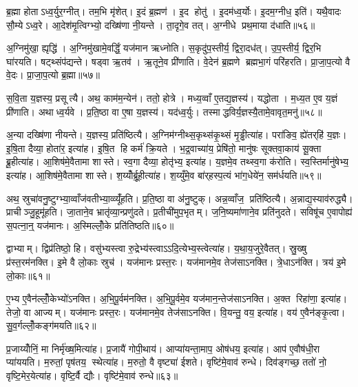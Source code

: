 ब्र॒ह्मा होताऽध्व॒र्युर॒ग्नीत्। तम॒भि मृ॑शेत्। इ॒दं ब्र॒ह्मण॑। इ॒द होतु॑। इ॒दम॑ध्व॒र्योः। इ॒दम॒ग्नीध॒ इति॑। यथै॒वादः सौ॒म्येऽध्व॒रे। आ॒देश॑मृ॒त्विग्भ्यो॒ दख्षि॑णा नी॒यन्ते। ता॒दृगे॒व तत्। अ॒ग्नीधे प्रथ॒माया द॑धाति॥५६॥

अ॒ग्निमु॑खा॒ ह्यृद्धि॑। अ॒ग्निमु॑खामे॒वर्द्धिं॒ यज॑मान ऋध्नोति। स॒कृदु॑प॒स्तीर्य॒ द्विरा॒दध॑त्। उ॒प॒स्तीर्य॒ द्विर॒भि घा॑रयति। षट्थ्संप॑द्यन्ते। षड्वा ऋ॒तव॑। ऋ॒तूने॒व प्री॑णाति। वे॒देन॑ ब्र॒ह्मणे ब्रह्मभा॒गं परि॑हरति। प्रा॒जा॒प॒त्यो वै वे॒दः। प्रा॒जा॒प॒त्यो ब्र॒ह्मा॥५७॥

स॒वि॒ता य॒ज्ञस्य॒ प्रसूत्यै। अथ॒ काम॑म॒न्येन॑। ततो॒ होत्रे। मध्य॒व्वाँ ए॒तद्य॒ज्ञस्य॑। यद्धोता। म॒ध्य॒त ए॒व य॒ज्ञं प्री॑णाति। अथाध्व॒र्यवे। प्र॒ति॒ष्ठा वा ए॒षा य॒ज्ञस्य॑। यद॑ध्व॒र्युः। तस्माद्धविर्य॒ज्ञस्यै॒तामे॒वावृत॒मनु॑॥५८॥

अ॒न्या दख्षि॑णा नीयन्ते। य॒ज्ञस्य॒ प्रति॑ष्ठित्यै। अ॒ग्निम॑ग्नीथ्स॒कृथ्स॑कृ॒थ्सं मृ॒ड्ढीत्या॑ह। परा॑ङिव॒ ह्ये॑तर्‌हि॑ य॒ज्ञः। इ॒षि॒ता दैव्या॒ होता॑र॒ इत्या॑ह। इ॒षि॒त हि कर्म॑ क्रि॒यते। भ॒द्र॒वाच्या॑य॒ प्रेषि॑तो॒ मानु॑षः सूक्तवा॒काय॑ सू॒क्ता ब्रू॒हीत्या॑ह। आ॒शिष॑मे॒वैतामा शास्ते। स्व॒गा दैव्या॒ होतृ॑भ्य॒ इत्या॑ह। य॒ज्ञमे॒व तथ्स्व॒गा क॑रोति। स्व॒स्तिर्मानु॑षेभ्य॒ इत्या॑ह। आ॒शिष॑मे॒वैतामा शास्ते। श॒य्योँर्ब्रू॒हीत्या॑ह। श॒य्युँमे॒व बा॑र्‌हस्प॒त्यं भा॑ग॒धेये॑न॒ सम॑र्धयति॥५९॥\anuvakamend[च॒र॒त्य॒ध्व॒र्युः प्रजा॑तिर्ह्वयते॒ वेदाब्रवीद्बर्‌हि॒षद॑ङ्करोत्यृ॒त्विजो॑ दधाति ब्र॒ह्माऽनु॑करोति च॒त्वारि॑ च]

अथ॒ स्रुचा॑वनु॒ष्टुग्भ्या॒व्वाँज॑वतीभ्या॒व्व्यूँ॑हति। प्र॒ति॒ष्ठा वा अ॑नु॒ष्टुक्। अन्न॒व्वाँज॒ प्रति॑ष्ठित्यै। अ॒न्नाद्य॒स्याव॑रुद्ध्यै। प्राचीञ्जु॒हूमू॑हति। जा॒ताने॒व भ्रातृ॑व्या॒न्प्रणु॑दते। प्र॒तीची॑मुप॒भृतम्। ज॒नि॒ष्यमा॑णाने॒व प्रति॑नुदते। सविषू॑च ए॒वापोह्य॑ स॒पत्ना॒न्॒ यज॑मानः। अ॒स्मिल्लोँ॒के प्रति॑तिष्ठति॥६०॥

द्वाभ्याम्। द्विप्र॑तिष्ठो॒ हि। वसु॑भ्यस्त्वा रु॒द्रेभ्य॑स्त्वाऽऽदि॒त्येभ्य॒स्त्वेत्या॑ह। य॒था॒य॒जुरे॒वैतत्। स्रु॒ख्षु प्र॑स्त॒रम॑नक्ति। इ॒मे वै लो॒काः स्रुच॑। यज॑मानः प्रस्त॒रः। यज॑मानमे॒व तेज॑साऽनक्ति। त्रे॒धाऽन॑क्ति। त्रय॑ इ॒मे लो॒काः॥६१॥

ए॒भ्य ए॒वैन॑ल्लोँ॒केभ्यो॑ऽनक्ति। अ॒भि॒पू॒र्वम॑नक्ति। अ॒भि॒पू॒र्वमे॒व यज॑मान॒न्तेज॑साऽनक्ति। अ॒क्त रिहा॑णा॒ इत्या॑ह। तेजो॒ वा आज्यम्। यज॑मानः प्रस्त॒रः। यज॑मानमे॒व तेज॑साऽनक्ति। वि॒यन्तु॒ वय॒ इत्या॑ह। वय॑ ए॒वैन॑ङ्कृ॒त्वा। सु॒व॒र्गल्लोँ॒कङ्ग॑मयति॥६२॥

प्र॒जाय्योँनिं॒ मा निर्मृ॑ख्ष॒मित्या॑ह। प्र॒जायै॑ गोपी॒थाय॑। आप्या॑यन्ता॒माप॒ ओष॑धय॒ इत्या॑ह। आप॑ ए॒वौष॑धी॒रा प्या॑ययति। म॒रुतां॒ पृष॑तय॒ स्थेत्या॑ह। म॒रुतो॒ वै वृष्ट्या॑ ईशते। वृष्टि॑मे॒वाव॑ रुन्धे। दिव॑ङ्गच्छ॒ ततो॑ नो॒ वृष्टि॒मेर॒येत्या॑ह। वृष्टि॒र्वै द्यौः। वृष्टि॑मे॒वाव॑ रुन्धे॥६३॥


